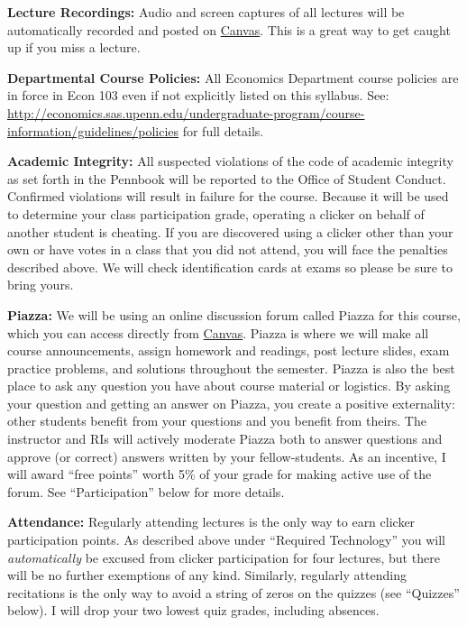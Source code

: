 \documentclass[11pt, letterpaper]{article}
\begin{document}
\bigskip

\noindent \textbf{Lecture Recordings: } 
Audio and screen captures of all lectures will be automatically recorded and posted on \href{http://upenn.instructure.com}{Canvas}. 
This is a great way to get caught up if you miss a lecture.

\bigskip

\noindent \textbf{Departmental Course Policies: } 
All Economics Department course policies are in force in Econ 103 even if not explicitly listed on this syllabus. 
See: \url{http://economics.sas.upenn.edu/undergraduate-program/course-information/guidelines/policies} for full details. 


\bigskip


\noindent \textbf{Academic Integrity: } 
All suspected violations of the code of academic integrity as set forth in the Pennbook will be reported to the Office of Student Conduct. 
Confirmed violations will result in failure for the course. 
Because it will be used to determine your class participation grade, operating a clicker on behalf of another student is cheating. 
If you are discovered using a clicker other than your own or have votes in a class that you did not attend, you will face the penalties described above. 
We will check identification cards at exams so please be sure to bring yours.

\bigskip

\noindent \textbf{Piazza:} 
We will be using an online discussion forum called Piazza for this course, which you can access directly from \href{http://upenn.instructure.com}{Canvas}. 
Piazza is where we will make all course announcements, assign homework and readings, post lecture slides, exam practice problems, and solutions throughout the semester. 
Piazza is also the best place to ask any question you have about course material or logistics. 
By asking your question and getting an answer on Piazza, you create a positive externality: other students benefit from your questions and you benefit from theirs. 
The instructor and RIs will actively moderate Piazza both to answer questions and approve (or correct) answers written by your fellow-students.
As an incentive, I will award ``free points'' worth 5\% of your grade for making active use of the forum. 
See ``Participation'' below for more details.

\bigskip

\noindent \textbf{Attendance:} 
Regularly attending lectures is the only way to earn clicker participation points. 
As described above under ``Required Technology'' you will \emph{automatically} be excused from clicker participation for four lectures, but there will be no further exemptions of any kind. 
Similarly, regularly attending recitations is the only way to avoid a string of zeros on the quizzes (see ``Quizzes'' below). 
I will drop your two lowest quiz grades, including absences.
\end{document}

